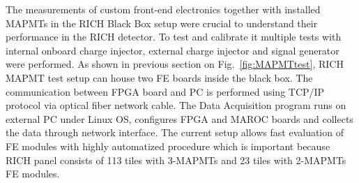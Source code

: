 The measurements of custom front-end electronics together with installed MAPMTs in the RICH Black Box setup were crucial to understand their performance in the RICH detector.
To test and calibrate it multiple tests with internal onboard charge injector, external charge injector and signal generator were performed.
As shown in previous section on Fig.~\ref{fig:MAPMTtest}, RICH MAPMT test setup can house two FE boards inside the black box.
The communication between FPGA board and PC is performed using TCP/IP protocol via optical fiber network cable.
The Data Acquisition program runs on external PC under Linux OS, configures FPGA and MAROC boards and collects the data through network interface.
The current setup allows fast evaluation of FE modules with highly automatized procedure which is important because RICH panel consists of 113 tiles with 3-MAPMTs and 23 tiles with 2-MAPMTs FE modules.
